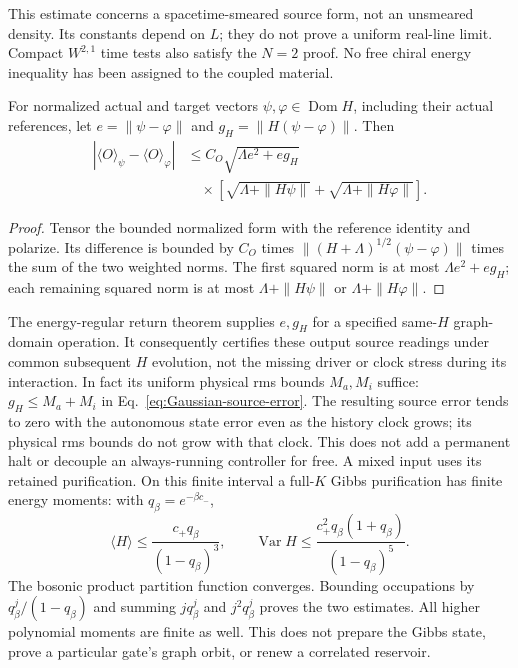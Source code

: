 This estimate concerns a spacetime-smeared source form, not an
unsmeared density. Its constants depend on $L$; they do not prove a
uniform real-line limit. Compact $W^{2,1}$ time tests also satisfy
the $N=2$ proof. No free chiral energy inequality has been assigned
to the coupled material.

\begin{corollary}
\label{cor:Gaussian-source-error}
For normalized actual and target vectors $\psi,\varphi\in
\operatorname{Dom}H$, including their actual references, let
$e=\|\psi-\varphi\|$ and $g_H=\|H(\psi-\varphi)\|$.
Then
\begin{align}
 |\langle O\rangle_\psi-\langle O\rangle_\varphi|
 &\le C_O\sqrt{\Lambda e^2+eg_H}\nonumber\\[-2pt]
 &\quad\times\left[\sqrt{\Lambda+\|H\psi\|}
                    +\sqrt{\Lambda+\|H\varphi\|}\right].
 \label{eq:Gaussian-source-error}
\end{align}
\end{corollary}
\begin{proof}
Tensor the bounded normalized form with the reference identity and
polarize. Its difference is bounded by $C_O$ times
$\|(H+\Lambda)^{1/2}(\psi-\varphi)\|$ times the sum of the two
weighted norms. The first squared norm is at most
$\Lambda e^2+eg_H$; each remaining squared norm is at most
$\Lambda+\|H\psi\|$ or $\Lambda+\|H\varphi\|$.
\end{proof}

The energy-regular return theorem supplies $e,g_H$ for a specified
same-$H$ graph-domain operation. It consequently certifies these
output source readings under common subsequent $H$ evolution, not
the missing driver or clock stress during its interaction.
In fact its uniform physical rms bounds $M_a,M_i$ suffice:
$g_H\le M_a+M_i$ in Eq.~\eqref{eq:Gaussian-source-error}.
The resulting source error tends to zero with the autonomous state
error even as the history clock grows; its physical rms bounds do
not grow with that clock. This does not add a permanent halt or
decouple an always-running controller for free.
A mixed input uses its retained purification. On this finite
interval a full-$K$ Gibbs purification has finite energy moments:
with $q_\beta=e^{-\beta c_-}$,
\[
 \langle H\rangle\le \frac{c_+q_\beta}{(1-q_\beta)^3},\qquad
 \operatorname{Var}H\le \frac{c_+^2q_\beta(1+q_\beta)}
                                    {(1-q_\beta)^5}.
\]
The bosonic product partition function converges. Bounding occupations
by $q_\beta^j/(1-q_\beta)$ and summing $j q_\beta^j$ and
$j^2q_\beta^j$ proves the two estimates. All higher polynomial moments
are finite as well. This does not prepare the Gibbs state, prove a
particular gate's graph orbit, or renew a correlated reservoir.

